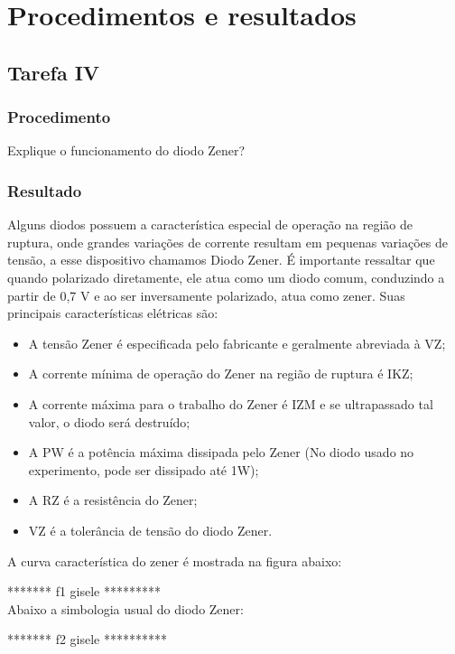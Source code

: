 \setcounter{topnumber}{5}
\setcounter{bottomnumber}{5}
\setcounter{totalnumber}{5}

\chapter{Procedimentos e resultados}

\section{Tarefa IV}
\subsection{Procedimento}
Explique o funcionamento do diodo Zener?
\subsection{Resultado}
Alguns diodos possuem a característica especial de operação na região de ruptura, onde grandes variações de corrente resultam em pequenas variações de tensão, a esse dispositivo chamamos Diodo Zener. 
É importante ressaltar que quando polarizado diretamente, ele atua como um diodo comum, conduzindo a partir de 0,7 V e ao ser inversamente polarizado, atua como zener.
Suas principais características elétricas são:
\begin{itemize}
	\item A tensão Zener é especificada pelo fabricante e geralmente abreviada à VZ;
	\item A corrente mínima de operação do Zener na região de ruptura é IKZ;
	\item A corrente máxima para o trabalho do Zener é IZM e se ultrapassado tal valor, o diodo será destruído;
	\item A PW é a potência máxima dissipada pelo Zener (No diodo usado no experimento, pode ser dissipado até 1W);
	\item A RZ é a resistência do Zener;
	\item VZ é a tolerância de tensão do diodo Zener.
\end{itemize}

A curva característica do zener é mostrada na figura abaixo:

******* f1 gisele ********* \\

Abaixo a simbologia usual do diodo Zener:

******* f2 gisele **********